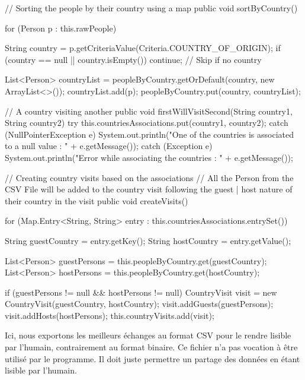 \documentclass{mytex}
\begin{document}
\begin{codebox}
// Sorting the people by their country using a map
public void sortByCountry() {
	for (Person p : this.rawPeople) {
		String country = p.getCriteriaValue(Criteria.COUNTRY_OF_ORIGIN);
		if (country == null || country.isEmpty()) continue; // Skip if no country
		
		List<Person> countryList = peopleByCountry.getOrDefault(country, new ArrayList<>());
		countryList.add(p);
		peopleByCountry.put(country, countryList);
	}
}

// A country visiting another
public void firstWillVisitSecond(String country1, String country2) {
	try {
		this.countriesAssociations.put(country1, country2);
	} catch (NullPointerException e) {
		System.out.println("One of the countries is associated to a null value : " + e.getMessage());
	} catch (Exception e) {
		System.out.println("Error while associating the countries : " + e.getMessage());
	}   
}

// Creating country visits based on the associations
// All the Person from the CSV File will be added to the country visit following the guest | host nature of their country in the visit
public void createVisits() {
	for (Map.Entry<String, String> entry : this.countriesAssociations.entrySet()) {
		String guestCountry = entry.getKey();
		String hostCountry = entry.getValue();
		
		List<Person> guestPersons = this.peopleByCountry.get(guestCountry);
		List<Person> hostPersons = this.peopleByCountry.get(hostCountry);
		
		if (guestPersons != null && hostPersons != null) {
			CountryVisit visit = new CountryVisit(guestCountry, hostCountry);
			visit.addGuests(guestPersons);
			visit.addHosts(hostPersons);
			this.countryVisits.add(visit);
		}
	}
}
\end{codebox}



Ici, nous exportons les meilleurs échanges au format CSV pour le rendre lisible par l'humain, contrairement au format binaire. Ce fichier n'a pas vocation à être utilisé par le programme. Il doit juste permettre un partage des données en étant lisible par l'humain.
\end{document}
